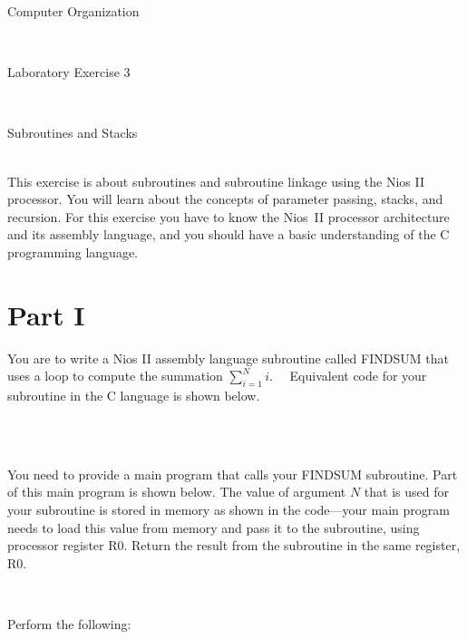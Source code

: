 \documentclass[epsfig,10pt,fullpage]{article}
\newcommand{\LabNum}{3}
\begin{document}
\centerline{\huge Computer Organization}
~\\
\centerline{\huge Laboratory Exercise \LabNum}
~\\
\centerline{\large Subroutines and Stacks}
~\\

This exercise is about subroutines and subroutine linkage using the Nios\textsuperscript{\textregistered} II processor.  You will 
learn about the concepts of parameter passing, stacks, and recursion.  For this 
exercise you have to know the Nios~II processor architecture and its assembly language, and 
you should have a basic understanding of the C programming language. 

\section*{Part I}
You are to write a Nios II assembly language subroutine called FINDSUM that uses a loop to 
compute the summation
$\displaystyle\sum_{i=1}^{N} i$.
~~Equivalent code for your subroutine in the C language is shown below. 

~\\
\begin{minipage}[t]{16.5 cm}

\end{minipage}

~\\
\noindent
You need to provide a main program that calls your FINDSUM subroutine.
Part of this main program is shown below.
The value of argument $N$ that is used for your subroutine is stored
in memory as shown in the code---your main program needs to load this value from memory and pass 
it to the subroutine, using processor register R0. Return the result from the subroutine
in the same register, R0.

~\\
\begin{minipage}[t]{16.5 cm}

\end{minipage}

\newpage
\noindent
Perform the following:
\end{document}
